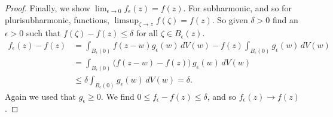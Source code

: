 \documentclass[12pt,openany]{book}
\theoremstyle{plain}
\theoremstyle{remark}
\theoremstyle{definition}
\theoremstyle{exercise}
\theoremstyle{example}
\begin{document}
\begin{proof}
Finally, we show $\lim_{\epsilon \to 0} f_\epsilon (z) = f(z)$.
For subharmonic, and so for plurisubharmonic,
functions, $\limsup_{\zeta\to z} f(\zeta) = f(z)$.
So given $\delta >0$ find an $\epsilon >0$ such that
$f(\zeta)-f(z) \leq \delta$ for all $\zeta \in B_\epsilon(z)$.
\begin{equation*}
\begin{split}
f_\epsilon(z) - f(z)
& =
\int_{B_\epsilon(0)} f(z-w) g_\epsilon (w)
\, dV(w)
- f(z) 
\int_{B_\epsilon(0)} g_\epsilon (w)
\, dV(w)
\\
& =
\int_{B_\epsilon(0)} \bigl(f(z-w)-f(z)\bigr)\, g_\epsilon (w)
\, dV(w)
\\
& \leq
\delta
\int_{B_\epsilon(0)} g_\epsilon (w)
\, dV(w)
= \delta .
\end{split}
\end{equation*}
Again we used that $g_\epsilon \geq 0$.
We find $0 \leq f_\epsilon - f(z) \leq \delta$, and so $f_\epsilon(z) \to
f(z)$.
\end{proof}
\end{document}

